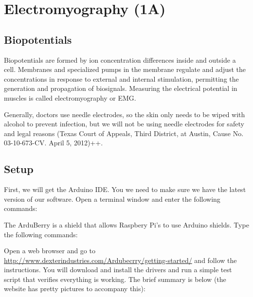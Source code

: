 \chapter{Electromyography (1A)}

\section{Biopotentials}

Biopotentials are formed by ion concentration differences inside and outside a cell.  Membranes and specialized pumps in the membrane regulate and adjust the concentrations in response to external and internal stimulation, permitting the generation and propagation of biosignals.  Measuring the electrical potential in muscles is called electromyography or EMG.


Generally, doctors use needle electrodes, so the skin only needs to be wiped with alcohol to prevent infection, but we will not be using needle electrodes for safety and legal reasons (Texas Court of Appeals, Third District, at Austin, Cause No. 03-10-673-CV. April 5, 2012)++.

\section{Setup}

First, we will get the Arduino IDE.  You  we need to make sure we have the latest version of our software.   Open a terminal window and enter the following commands:




The ArduBerry is a shield that allows Raspbery Pi's to use Arduino shields.  Type the following commands:



Open a web browser and go to \url{http://www.dexterindustries.com/Ardubecrry/getting-started/} and follow the instructions.  You will download and install the drivers and run a simple test script that verifies everything is working.  The brief summary is below (the website has pretty pictures to accompany this):

